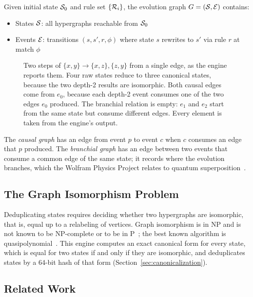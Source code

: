 \begin{definition}
Given initial state $\mathcal{S}_0$ and rule set $\{\mathcal{R}_i\}$, the evolution graph $G = (\mathcal{S}, \mathcal{E})$ contains:
\begin{itemize}
    \item States $\mathcal{S}$: all hypergraphs reachable from $\mathcal{S}_0$
    \item Events $\mathcal{E}$: transitions $(s, s', r, \phi)$ where state $s$ rewrites to $s'$ via rule $r$ at match $\phi$
\end{itemize}
\end{definition}

\begin{figure}[htbp]
\centering

\caption{Two steps of $\{x,y\} \rightarrow \{x,z\},\{z,y\}$ from a single edge, as the engine
reports them. Four raw states reduce to three canonical states, because the two depth-2 results
are isomorphic. Both causal edges come from $e_0$, because each depth-2 event consumes one of the
two edges $e_0$ produced. The branchial relation is empty: $e_1$ and $e_2$ start from the same
state but consume different edges. Every element is taken from the engine's output.}
\label{fig:worked-example}
\end{figure}

The \emph{causal graph} has an edge from event $p$ to event $c$ when $c$ consumes an edge that $p$ produced. The \emph{branchial graph} has an edge between two events that consume a common edge of the same state; it records where the evolution branches, which the Wolfram Physics Project relates to quantum superposition~\cite{wolfram2020project}.

\subsection{The Graph Isomorphism Problem}

Deduplicating states requires deciding whether two hypergraphs are isomorphic, that is, equal up to a relabeling of vertices. Graph isomorphism is in NP and is not known to be NP-complete or to be in P~\cite{kobler2012graph}; the best known algorithm is quasipolynomial~\cite{babai2016quasipolynomial}. This engine computes an exact canonical form for every state, which is equal for two states if and only if they are isomorphic, and deduplicates states by a 64-bit hash of that form (Section~\ref{sec:canonicalization}).

\subsection{Related Work}

